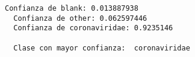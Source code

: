 \documentclass[11pt]{uc3mpracticas}
\begin{document}
      \begin{Verbatim}[commandchars=\\\{\}]
  Confianza de blank: 0.013887938
  Confianza de other: 0.062597446
  Confianza de coronaviridae: 0.9235146

  Clase con mayor confianza:  coronaviridae
      \end{Verbatim}

      \begin{center}
      \end{center}
      { \hspace*{\fill} \\}





  
\end{document}
